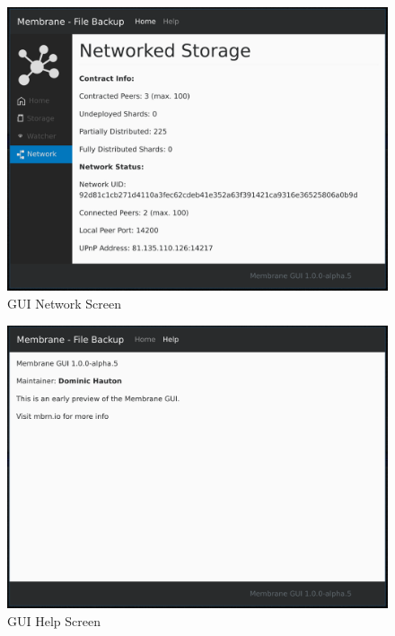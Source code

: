 \documentclass[11pt, a4paper, twoside]{report}
\begin{document}
\begin{figure}[!htb]
 \centering
 \includegraphics[width=\textwidth]{gui-network}
 \caption{GUI Network Screen}
 \label{fig:gui-network}
\end{figure}

\begin{figure}[!htb]
 \centering
 \includegraphics[width=\textwidth]{gui-help}
 \caption{GUI Help Screen}
 \label{fig:gui-help}
\end{figure}
\end{document}
